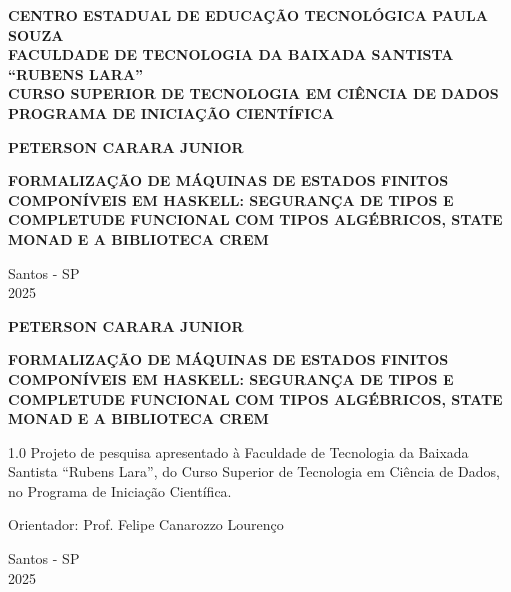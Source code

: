 \documentclass[12pt,a4paper]{article}
\newcommand{\nomealuno}{PETERSON CARARA JUNIOR}
\newcommand{\titulo}{Formalização de Máquinas de Estados Finitos Componíveis em Haskell}
\newcommand{\subtitulo}{Segurança de Tipos e Completude Funcional com Tipos Algébricos, State Monad e a Biblioteca CREM}
\newcommand{\curso}{Curso Superior de Tecnologia em Ciência de Dados}
\newcommand{\orientador}{Prof. Felipe Canarozzo Lourenço}
\newcommand{\cidade}{Santos - SP}
\newcommand{\ano}{2025}
\begin{document}
\begin{titlepage}
    \begin{center}
        \MakeUppercase{\textbf{Centro Estadual de Educação Tecnológica Paula Souza}}\\
        \MakeUppercase{\textbf{Faculdade de Tecnologia da Baixada Santista ``Rubens Lara''}}\\
        \MakeUppercase{\textbf{\curso}}\\
        \MakeUppercase{\textbf{Programa de Iniciação Científica}}
        
        \vspace{6cm}
        
        \MakeUppercase{\textbf{\nomealuno}}
        
        \vspace{4cm}
        
        \MakeUppercase{\textbf{\titulo: \subtitulo}}
        
        \vfill
        
        \cidade\\
        \ano
    \end{center}
\end{titlepage}

\begin{titlepage}
    \begin{center}
        \MakeUppercase{\textbf{\nomealuno}}
        
        \vspace{6cm}
        
        \MakeUppercase{\textbf{\titulo: \subtitulo}}
        
        \vspace{3cm}
        
        \begin{flushright}
            \begin{minipage}{8cm}
                \begin{spacing}{1.0}
                    Projeto de pesquisa apresentado à Faculdade de Tecnologia da Baixada Santista ``Rubens Lara'', do \curso, no Programa de Iniciação Científica.
                    
                    \vspace{0.5cm}
                    
                    Orientador: \orientador
                \end{spacing}
            \end{minipage}
        \end{flushright}
        
        \vfill
        
        \cidade\\
        \ano
    \end{center}
\end{titlepage}
\end{document}
